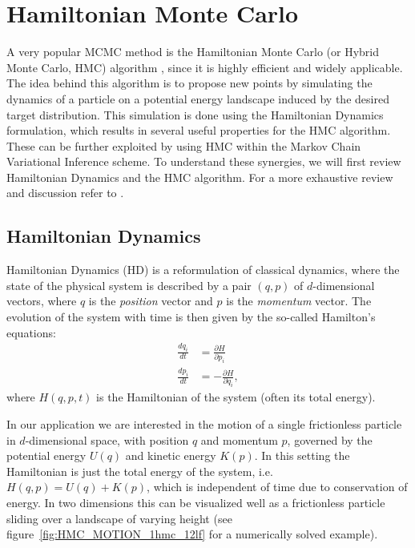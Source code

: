 \section{Hamiltonian Monte Carlo}
\label{sec:HMC}
A very popular MCMC method is the Hamiltonian Monte Carlo (or Hybrid Monte Carlo, HMC) algorithm \parencite{Duane1987}, since it is highly efficient and widely applicable. The idea behind this algorithm is to propose new points by simulating the dynamics of a particle on a potential energy landscape induced by the desired target distribution. This simulation is done using the Hamiltonian Dynamics formulation, which results in several useful properties for the HMC algorithm. These can be further exploited by using HMC within the Markov Chain Variational Inference scheme. To understand these synergies, we will first review Hamiltonian Dynamics and the HMC algorithm. For a more exhaustive review and discussion refer to \parencite{Neal2011}.

\subsection{Hamiltonian Dynamics}

Hamiltonian Dynamics (HD) is a reformulation of classical dynamics, where the state of the physical system is described by a pair $(q, p)$ of $d$-dimensional vectors, where $q$ is the \textit{position} vector and $p$ is the \textit{momentum} vector. The evolution of the system with time is then given by the so-called Hamilton's equations:
\begin{equation} \label{eq:HamiltonsEquations}
\begin{split}
\frac{dq_i}{dt} &= \frac{\partial H}{\partial p_i} \\
\frac{dp_i}{dt} &= - \frac{\partial H}{\partial q_i},
\end{split}
\end{equation}
where $H(q, p, t)$ is the Hamiltonian of the system (often its total energy).

In our application we are interested in the motion of a single frictionless particle in $d$-dimensional space, with position $q$ and momentum $p$, governed by the potential energy $U(q)$ and kinetic energy $K(p)$. In this setting the Hamiltonian is just the total energy of the system, i.e. $H(q, p) = U(q) + K(p)$, which is independent of time due to conservation of energy. In two dimensions this can be visualized well as a frictionless particle sliding over a landscape of varying height (see figure~\ref{fig:HMC_MOTION_1hmc_12lf} for a numerically solved example).

